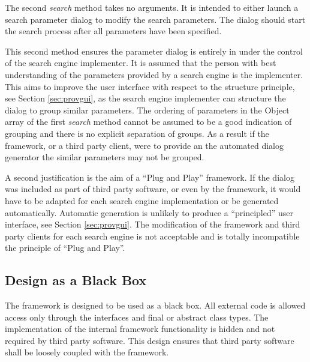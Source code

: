 The second \emph{search} method takes no arguments.
It is intended to either launch a search parameter dialog to modify the search parameters.
The dialog should start the search process after all parameters have been specified.

This second method ensures the parameter dialog is entirely in under the control of the search engine implementer.
It is assumed that the person with best understanding of the parameters provided by a search engine is the implementer.
This aims to improve the user interface with respect to the structure principle, see Section \ref{sec:provgui}, as the search engine implementer can structure the dialog to group similar parameters.
The ordering of parameters in the Object array of the first \emph{search} method cannot be assumed to be a good indication of grouping and there is no explicit separation of groups.
As a result if the framework, or a third party client, were to provide an the automated dialog generator the similar parameters may not be grouped.

A second justification is the aim of a ``Plug and Play'' framework.
If the dialog was included as part of third party software, or even by the framework, it would have to be adapted for each search engine implementation or be generated automatically.
Automatic generation is unlikely to produce a ``principled'' user interface, see Section \ref{sec:provgui}.
The modification of the framework and third party clients for each search engine is not acceptable and is totally incompatible the principle of ``Plug and Play''.

\subsection{Design as a Black Box}
\label{sec:thirdpartyblackbox}
The framework is designed to be used as a black box.
All external code is allowed access only through the interfaces and final or abstract class types.
The implementation of the internal framework functionality is hidden and not required by third party software.
This design ensures that third party software shall be loosely coupled with the framework.

